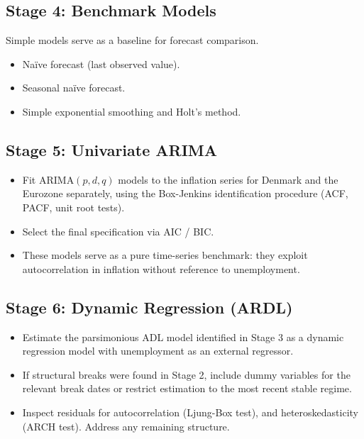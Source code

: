 \subsection{Stage 4: Benchmark Models}

Simple models serve as a baseline for forecast comparison.

\begin{itemize}[nosep]
    \item Na\"{i}ve forecast (last observed value).
    \item Seasonal na\"{i}ve forecast.
    \item Simple exponential smoothing and Holt's method.
\end{itemize}

\subsection{Stage 5: Univariate ARIMA}

\begin{itemize}[nosep]
    \item Fit ARIMA$(p, d, q)$ models to the inflation series for Denmark and
          the Eurozone separately, using the Box-Jenkins identification
          procedure (ACF, PACF, unit root tests).
    \item Select the final specification via AIC / BIC.
    \item These models serve as a pure time-series benchmark: they exploit
          autocorrelation in inflation without reference to unemployment.
\end{itemize}

\subsection{Stage 6: Dynamic Regression (ARDL)}

\begin{itemize}[nosep]
    \item Estimate the parsimonious ADL model identified in Stage 3 as a
          dynamic regression model with unemployment as an external regressor.
    \item If structural breaks were found in Stage 2, include dummy variables
          for the relevant break dates or restrict estimation to the most
          recent stable regime.
    \item Inspect residuals for autocorrelation (Ljung-Box test), and
          heteroskedasticity (ARCH test). Address any remaining structure.
\end{itemize}

